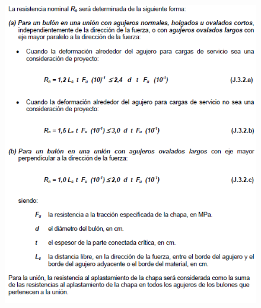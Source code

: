 \documentclass[twocolumn]{article}
\begin{document}
\begin{figure}[htb!]
	\centering
	\includegraphics[width=1.13\linewidth]{fig/resistchapas.PNG}
\end{figure}
\end{document}
